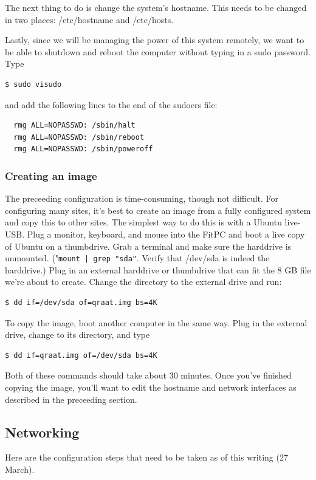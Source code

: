 \documentclass[letter]{article}
\begin{document}
The next thing to do is change the system's hostname. This needs to be changed in two places:
/etc/hostname and /etc/hosts. 

Lastly, since we will be managing the power of this system remotely, we want to be able to 
shutdown and reboot the computer without typing in a sudo password. Type 
\begin{verbatim}
$ sudo visudo
\end{verbatim}
and add the following lines to the end of the sudoers file: 
\begin{verbatim}
  rmg ALL=NOPASSWD: /sbin/halt
  rmg ALL=NOPASSWD: /sbin/reboot
  rmg ALL=NOPASSWD: /sbin/poweroff
\end{verbatim}

\subsubsection{Creating an image}
The preceeding configuration is time-consuming, though not difficult. For configuring many sites, 
it's best to create an image from a fully configured system and copy this to other sites. The 
simplest way to do this is with a Ubuntu live-USB. Plug a monitor, keyboard, and mouse into the 
FitPC and boot a live copy of Ubuntu on a thumbdrive. Grab a terminal and make sure the harddrive
is unmounted. ("\texttt{mount | grep "sda"}. Verify that /dev/sda is indeed the 
harddrive.) Plug in an external harddrive or thumbdrive that can 
fit the 8 GB file we're about to create. Change the directory to the external drive and run: 
\begin{verbatim}
$ dd if=/dev/sda of=qraat.img bs=4K 
\end{verbatim}
To copy the image, boot another computer in the same way. Plug in the external drive, change to 
its directory, and type
\begin{verbatim}
$ dd if=qraat.img of=/dev/sda bs=4K
\end{verbatim}

Both of these commands should take about 30 minutes. Once you've finished copying the image, you'll 
want to edit the hostname and network interfaces as described in the preceeding section.  



\subsection{Networking}
Here are the configuration steps that need to be taken as of this writing (27 March).
\end{document}
